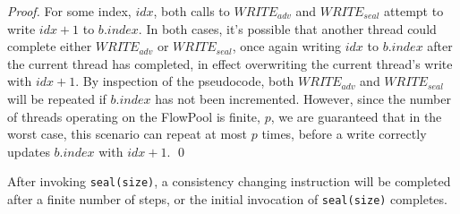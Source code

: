 \documentclass[runningheads,a4paper]{llncs}
\begin{document}
\begin{proof}
For some index, $idx$, both calls to $WRITE_{adv}$ and $WRITE_{seal}$ attempt
to write $idx+1$ to $b.index$. In both cases, it's possible that another
thread could complete either $WRITE_{adv}$ or $WRITE_{seal}$, once again
writing $idx$ to $b.index$ after the current thread has completed, in effect
overwriting the current thread's write with $idx+1$. By inspection of the
pseudocode, both $WRITE_{adv}$ and $WRITE_{seal}$ will be repeated if
$b.index$ has not been incremented. However, since the number of threads
operating on the FlowPool is finite, $p$, we are guaranteed that in the worst
case, this scenario can repeat at most $p$ times, before a write correctly
updates $b.index$ with $idx+1$.
\qed
\end{proof}


\begin{lemma}\label{lemma-finite-steps-consistency-change}
After invoking \verb=seal(size)=, a consistency changing instruction will be
completed after a finite number of steps, or the initial invocation of
\verb=seal(size)= completes.
\end{lemma}
\end{document}
